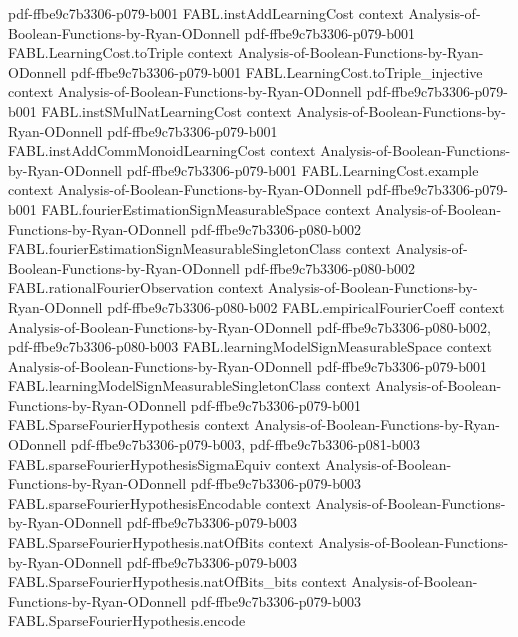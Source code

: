 \begin{theorem}
  {pdf-ffbe9c7b3306-p079-b001}
\proofstep
  {FABL.instAddLearningCost}
  {context}
  {Analysis-of-Boolean-Functions-by-Ryan-ODonnell}
  {pdf-ffbe9c7b3306-p079-b001}
\proofstep
  {FABL.LearningCost.toTriple}
  {context}
  {Analysis-of-Boolean-Functions-by-Ryan-ODonnell}
  {pdf-ffbe9c7b3306-p079-b001}
\proofstep
  {FABL.LearningCost.toTriple_injective}
  {context}
  {Analysis-of-Boolean-Functions-by-Ryan-ODonnell}
  {pdf-ffbe9c7b3306-p079-b001}
\proofstep
  {FABL.instSMulNatLearningCost}
  {context}
  {Analysis-of-Boolean-Functions-by-Ryan-ODonnell}
  {pdf-ffbe9c7b3306-p079-b001}
\proofstep
  {FABL.instAddCommMonoidLearningCost}
  {context}
  {Analysis-of-Boolean-Functions-by-Ryan-ODonnell}
  {pdf-ffbe9c7b3306-p079-b001}
\proofstep
  {FABL.LearningCost.example}
  {context}
  {Analysis-of-Boolean-Functions-by-Ryan-ODonnell}
  {pdf-ffbe9c7b3306-p079-b001}
\proofstep
  {FABL.fourierEstimationSignMeasurableSpace}
  {context}
  {Analysis-of-Boolean-Functions-by-Ryan-ODonnell}
  {pdf-ffbe9c7b3306-p080-b002}
\proofstep
  {FABL.fourierEstimationSignMeasurableSingletonClass}
  {context}
  {Analysis-of-Boolean-Functions-by-Ryan-ODonnell}
  {pdf-ffbe9c7b3306-p080-b002}
\proofstep
  {FABL.rationalFourierObservation}
  {context}
  {Analysis-of-Boolean-Functions-by-Ryan-ODonnell}
  {pdf-ffbe9c7b3306-p080-b002}
\proofstep
  {FABL.empiricalFourierCoeff}
  {context}
  {Analysis-of-Boolean-Functions-by-Ryan-ODonnell}
  {pdf-ffbe9c7b3306-p080-b002,
    pdf-ffbe9c7b3306-p080-b003}
\proofstep
  {FABL.learningModelSignMeasurableSpace}
  {context}
  {Analysis-of-Boolean-Functions-by-Ryan-ODonnell}
  {pdf-ffbe9c7b3306-p079-b001}
\proofstep
  {FABL.learningModelSignMeasurableSingletonClass}
  {context}
  {Analysis-of-Boolean-Functions-by-Ryan-ODonnell}
  {pdf-ffbe9c7b3306-p079-b001}
\proofstep
  {FABL.SparseFourierHypothesis}
  {context}
  {Analysis-of-Boolean-Functions-by-Ryan-ODonnell}
  {pdf-ffbe9c7b3306-p079-b003,
    pdf-ffbe9c7b3306-p081-b003}
\proofstep
  {FABL.sparseFourierHypothesisSigmaEquiv}
  {context}
  {Analysis-of-Boolean-Functions-by-Ryan-ODonnell}
  {pdf-ffbe9c7b3306-p079-b003}
\proofstep
  {FABL.sparseFourierHypothesisEncodable}
  {context}
  {Analysis-of-Boolean-Functions-by-Ryan-ODonnell}
  {pdf-ffbe9c7b3306-p079-b003}
\proofstep
  {FABL.SparseFourierHypothesis.natOfBits}
  {context}
  {Analysis-of-Boolean-Functions-by-Ryan-ODonnell}
  {pdf-ffbe9c7b3306-p079-b003}
\proofstep
  {FABL.SparseFourierHypothesis.natOfBits_bits}
  {context}
  {Analysis-of-Boolean-Functions-by-Ryan-ODonnell}
  {pdf-ffbe9c7b3306-p079-b003}
\proofstep
  {FABL.SparseFourierHypothesis.encode}

\end{theorem}
